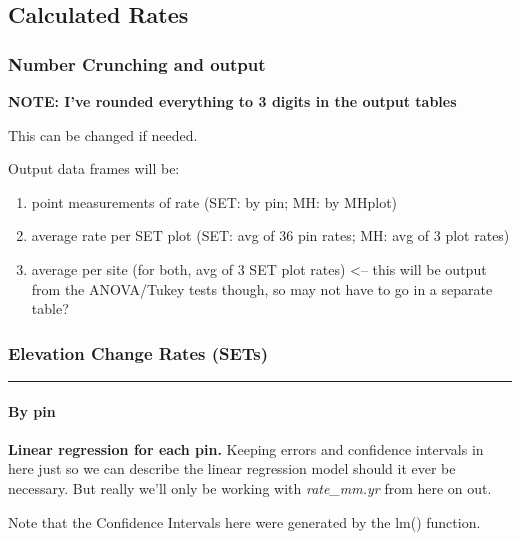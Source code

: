 \documentclass[]{article}
\providecommand{\tightlist}{%
  \setlength{\itemsep}{0pt}\setlength{\parskip}{0pt}}
\let\oldparagraph\paragraph
\renewcommand{\paragraph}[1]{\oldparagraph{#1}\mbox{}}
\begin{document}
\subsection{Calculated Rates}\label{calculated-rates}

\subsubsection{Number Crunching and
output}\label{number-crunching-and-output}

\textbf{NOTE: I've rounded everything to 3 digits in the output tables}

This can be changed if needed.

Output data frames will be:

\begin{enumerate}
\def\labelenumi{\alph{enumi}.}
\tightlist
\item
  point measurements of rate (SET: by pin; MH: by MHplot)\\
\item
  average rate per SET plot (SET: avg of 36 pin rates; MH: avg of 3 plot
  rates)\\
\item
  average per site (for both, avg of 3 SET plot rates) \textless{}--
  this will be output from the ANOVA/Tukey tests though, so may not have
  to go in a separate table?
\end{enumerate}

\subsubsection{Elevation Change Rates
(SETs)}\label{elevation-change-rates-sets}

\begin{center}\rule{0.5\linewidth}{\linethickness}\end{center}

\paragraph{By pin}\label{by-pin}

\textbf{Linear regression for each pin.} Keeping errors and confidence
intervals in here just so we can describe the linear regression model
should it ever be necessary. But really we'll only be working with
\emph{rate\_mm.yr} from here on out.

Note that the Confidence Intervals here were generated by the lm()
function.
\end{document}
